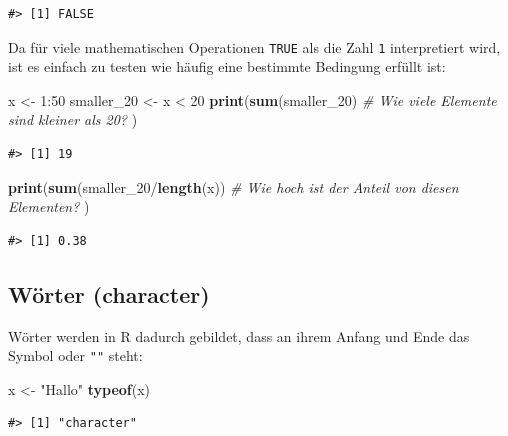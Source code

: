 \documentclass[]{tufte-book}
\newenvironment{Shaded}{}{}
\newcommand{\KeywordTok}[1]{\textcolor[rgb]{0.00,0.44,0.13}{\textbf{#1}}}
\newcommand{\DecValTok}[1]{\textcolor[rgb]{0.25,0.63,0.44}{#1}}
\newcommand{\StringTok}[1]{\textcolor[rgb]{0.25,0.44,0.63}{#1}}
\newcommand{\CommentTok}[1]{\textcolor[rgb]{0.38,0.63,0.69}{\textit{#1}}}
\newcommand{\OperatorTok}[1]{\textcolor[rgb]{0.40,0.40,0.40}{#1}}
\newcommand{\NormalTok}[1]{#1}
\begin{document}
\begin{verbatim}
#> [1] FALSE
\end{verbatim}

Da für viele mathematischen Operationen \texttt{TRUE} als die Zahl
\texttt{1} interpretiert wird, ist es einfach zu testen wie häufig eine
bestimmte Bedingung erfüllt ist:

\begin{Shaded}
\begin{Highlighting}[]
\NormalTok{x <-}\StringTok{ }\DecValTok{1}\OperatorTok{:}\DecValTok{50}
\NormalTok{smaller_}\DecValTok{20}\NormalTok{ <-}\StringTok{ }\NormalTok{x }\OperatorTok{<}\StringTok{ }\DecValTok{20}
\KeywordTok{print}\NormalTok{(}\KeywordTok{sum}\NormalTok{(smaller_}\DecValTok{20}\NormalTok{)  }\CommentTok{# Wie viele Elemente sind kleiner als 20?}
\NormalTok{)}
\end{Highlighting}
\end{Shaded}

\begin{verbatim}
#> [1] 19
\end{verbatim}

\begin{Shaded}
\begin{Highlighting}[]
\KeywordTok{print}\NormalTok{(}\KeywordTok{sum}\NormalTok{(smaller_}\DecValTok{20}\OperatorTok{/}\KeywordTok{length}\NormalTok{(x))  }\CommentTok{# Wie hoch ist der Anteil von diesen Elementen?}
\NormalTok{)}
\end{Highlighting}
\end{Shaded}

\begin{verbatim}
#> [1] 0.38
\end{verbatim}

\subsection{Wörter (character)}\label{worter-character}

Wörter werden in R dadurch gebildet, dass an ihrem Anfang und Ende das
Symbol \texttt{\textquotesingle{}} oder \texttt{""} steht:

\begin{Shaded}
\begin{Highlighting}[]
\NormalTok{x <-}\StringTok{ "Hallo"}
\KeywordTok{typeof}\NormalTok{(x)}
\end{Highlighting}
\end{Shaded}

\begin{verbatim}
#> [1] "character"
\end{verbatim}
\end{document}
